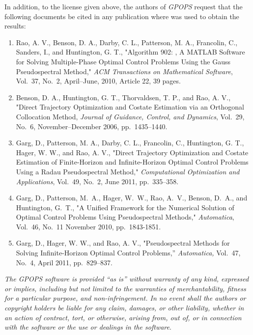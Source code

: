 In addition, to the license given above, the authors of {\em GPOPS}
request that the following documents be cited in any publication where
\gpops was used to obtain the results:
\begin{enumerate}[(1)]
\item Rao, A. V., Benson, D. A., Darby, C. L., Patterson, M. A.,
        Francolin, C., Sanders, I., and Huntington, G. T., "Algorithm
        902:  \gpops, A MATLAB Software for Solving Multiple-Phase
        Optimal Control Problems Using the Gauss Pseudospectral
        Method," {\em ACM Transactions on Mathematical Software},
        Vol.~37, No.~2, April--June, 2010, Article 22, 39 pages.
\item Benson, D. A., Huntington, G. T., Thorvaldsen, T. P., and Rao,
        A. V., "Direct Trajectory Optimization and Costate Estimation
        via an Orthogonal Collocation Method, {\em Journal of
        Guidance, Control, and Dynamics}, Vol.~29, No.~6,
        November--December 2006, pp.~1435--1440.
\item Garg, D., Patterson, M. A., Darby, C. L., Francolin, C.,
        Huntington, G. T., Hager, W. W., and Rao, A. V., "Direct
        Trajectory Optimization and Costate Estimation of
        Finite-Horizon and Infinite-Horizon Optimal Control Problems
        Using a Radau Pseudospectral Method," {\em Computational
        Optimization and Applications}, Vol.~49, No.~2, June 2011,
        pp.~335--358.
\item  Garg, D., Patterson, M.~A., Hager, W.~W., Rao, A.~V., Benson,
  D.~A., and Huntington, G.~T., "A Unified Framework 
       for the Numerical Solution of Optimal Control Problems    
       Using Pseudospectral Methods," {\em Automatica}, Vol.~46,
        No.~11 November 2010, pp.~1843-1851.                                                                 
\item  Garg, D., Hager, W. W., and Rao, A. V., "Pseudospectral Methods
        for Solving Infinite-Horizon Optimal Control Problems,'' {\em
        Automatica,} Vol.~47, No.~4, April 2011, pp.~829--837.
\end{enumerate}
{\em The GPOPS software is provided ``as is'' without warranty of any
kind, expressed or implies, including but not limited to the
warranties of merchantability, fitness for a particular purpose, and
non-infringement.  In no event shall the authors or copyright holders
be liable for any claim, damages, or other liability, whether in an
action of contract, tort, or otherwise, arising from, out of, or in
connection with the software or the use or dealings in the software}.
